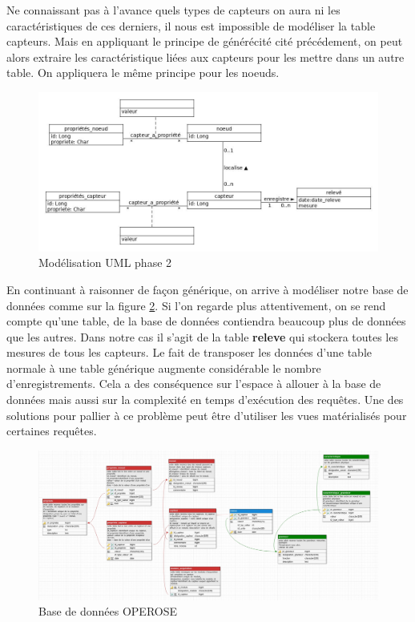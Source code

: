 Ne connaissant pas à l'avance quels types de capteurs on aura ni les caractéristiques de ces derniers, il nous est impossible de modéliser la table capteurs. Mais en appliquant le principe de générécité cité précédement, on peut alors extraire les caractéristique liées aux capteurs pour les mettre dans un autre table. On appliquera le même principe pour les noeuds.
\begin{figure}[!h]
   \begin{center}
        \includegraphics[width=1\textwidth]{images/uml_image2.jpg}
    \caption{ Modélisation UML phase 2}
    \label{fig : Modélisation UML phase 2}
   \end{center}
\end{figure}
En continuant à raisonner de façon générique, on arrive à modéliser notre base de données comme sur la figure \ref{ Base de données OPEROSE}. Si l'on regarde plus attentivement, on se rend compte qu'une table, de la base de données contiendra beaucoup plus de données que les autres. Dans notre cas il s'agit de la table \textbf{releve} qui stockera toutes les mesures de tous les capteurs. Le fait de transposer les données d'une table normale à une table générique augmente considérable le nombre d'enregistrements. Cela a des conséquence sur l'espace à allouer à la base de données mais aussi sur la complexité en temps d'exécution des requêtes. Une des solutions pour pallier à ce problème peut être d'utiliser les vues matérialisés pour certaines requêtes.


\begin{landscape}
\begin{figure}
   \begin{center}
       \includegraphics[width=1.8\textwidth]{images/bd_image3.jpg}
    \caption{ Base de données OPEROSE}
     \label{ Base de données OPEROSE}
   \end{center}
\end{figure}
\end{landscape}






